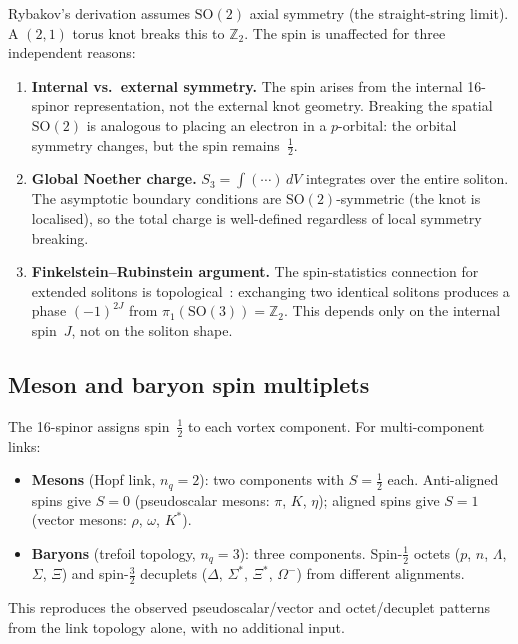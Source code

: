 \documentclass[11pt]{article}
\newcommand{\half}{\tfrac{1}{2}}
\begin{document}
Rybakov's derivation assumes $\mathrm{SO}(2)$ axial symmetry (the
straight-string limit).  A $(2,1)$ torus knot breaks this to
$\mathbb{Z}_2$.  The spin is unaffected for three independent reasons:
\begin{enumerate}
\item \textbf{Internal vs.\ external symmetry.}  The spin arises from
      the internal 16-spinor representation, not the external knot
      geometry.  Breaking the spatial $\mathrm{SO}(2)$ is analogous
      to placing an electron in a $p$-orbital: the orbital symmetry
      changes, but the spin remains~$\half$.
\item \textbf{Global Noether charge.}  $S_3 = \int(\cdots)\,dV$
      integrates over the entire soliton.  The asymptotic boundary
      conditions are $\mathrm{SO}(2)$-symmetric (the knot is
      localised), so the total charge is well-defined regardless of
      local symmetry breaking.
\item \textbf{Finkelstein--Rubinstein argument.}  The spin-statistics
      connection for extended solitons is
      topological~\cite{FR1968}: exchanging two identical solitons
      produces a phase $(-1)^{2J}$ from
      $\pi_1(\mathrm{SO}(3)) = \mathbb{Z}_2$.  This depends only on
      the internal spin~$J$, not on the soliton shape.
\end{enumerate}

\subsection{Meson and baryon spin multiplets}

The 16-spinor assigns spin~$\half$ to each vortex component.  For
multi-component links:
\begin{itemize}
\item \textbf{Mesons} (Hopf link, $n_q = 2$): two components with
      $S = \half$ each.  Anti-aligned spins give $S = 0$
      (pseudoscalar mesons: $\pi$, $K$, $\eta$); aligned spins give
      $S = 1$ (vector mesons: $\rho$, $\omega$, $K^*$).
\item \textbf{Baryons} (trefoil topology, $n_q = 3$): three
      components.  Spin-$\half$ octets ($p$, $n$, $\Lambda$,
      $\Sigma$, $\Xi$) and spin-$\frac{3}{2}$ decuplets ($\Delta$,
      $\Sigma^*$, $\Xi^*$, $\Omega^-$) from different alignments.
\end{itemize}
This reproduces the observed pseudoscalar/vector and octet/decuplet
patterns from the link topology alone, with no additional input.
\end{document}

